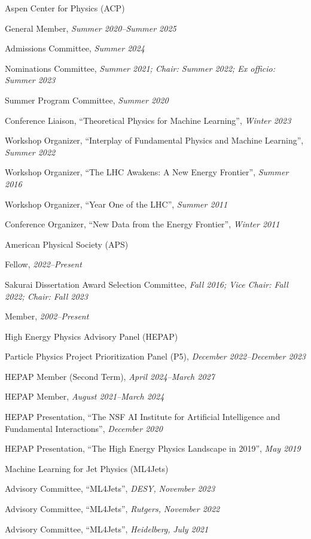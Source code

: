 \item Aspen Center for Physics (ACP)
\bsbl 
\item General Member, \emph{Summer 2020--Summer 2025}
\item Admissions Committee, \emph{Summer 2024}
\item Nominations Committee, \emph{Summer 2021; Chair: Summer 2022; Ex officio: Summer 2023}
\item Summer Program Committee, \emph{Summer 2020}
\item Conference Liaison, ``Theoretical Physics for Machine Learning'', \emph{Winter 2023}
\item Workshop Organizer, ``Interplay of Fundamental Physics and Machine Learning'', \emph{Summer 2022}
\item Workshop Organizer, ``The LHC Awakens: A New Energy Frontier'', \emph{Summer 2016}
\item Workshop Organizer, ``Year One of the LHC'', \emph{Summer 2011}
\item Conference Organizer, ``New Data from the Energy Frontier'', \emph{Winter 2011}
\el 
\item American Physical Society (APS)
\bsbl 
\item Fellow, \emph{2022--Present}
\item Sakurai Dissertation Award Selection Committee, \emph{Fall 2016; Vice Chair: Fall 2022; Chair: Fall 2023}
\item Member, \emph{2002--Present}
\el 
\item High Energy Physics Advisory Panel (HEPAP)
\bsbl 
\item Particle Physics Project Prioritization Panel (P5), \emph{December 2022--December 2023}
\item HEPAP Member (Second Term), \emph{April 2024--March 2027}
\item HEPAP Member, \emph{August 2021--March 2024}
\item HEPAP Presentation, ``The NSF AI Institute for Artificial Intelligence and Fundamental Interactions'', \emph{December 2020}
\item HEPAP Presentation, ``The High Energy Physics Landscape in 2019'', \emph{May 2019}
\el 
\item Machine Learning for Jet Physics (ML4Jets)
\bsbl 
\item Advisory Committee, ``ML4Jets'', \emph{DESY, }\emph{November 2023}
\item Advisory Committee, ``ML4Jets'', \emph{Rutgers, }\emph{November 2022}
\item Advisory Committee, ``ML4Jets'', \emph{Heidelberg, }\emph{July 2021}
